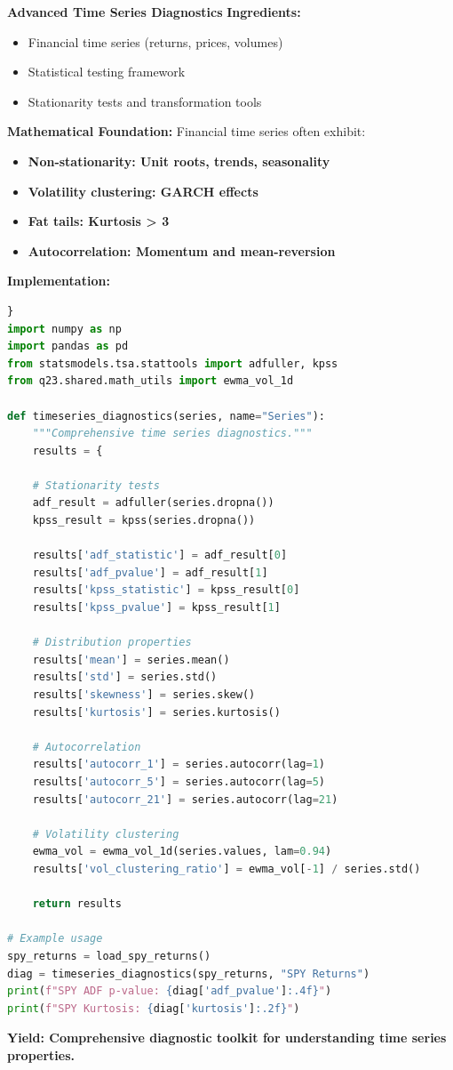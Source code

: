 \documentclass[11pt,letterpaper,openany]{book}
\begin{document}
\textbf{Advanced Time Series Diagnostics}
\textbf{Ingredients:}
\begin{itemize}
    \item Financial time series (returns, prices, volumes)
    \item Statistical testing framework
    \item Stationarity tests and transformation tools
\end{itemize}
\textbf{Mathematical Foundation:}
Financial time series often exhibit:
\begin{itemize}
    \item \textbf{Non-stationarity: Unit roots, trends, seasonality}
    \item \textbf{Volatility clustering: GARCH effects}
    \item \textbf{Fat tails: Kurtosis > 3}
    \item \textbf{Autocorrelation: Momentum and mean-reversion}
\end{itemize}
\textbf{Implementation:}
\begin{lstlisting}[language=Python,caption=Q23 Time Series Diagnostics]}
import numpy as np
import pandas as pd
from statsmodels.tsa.stattools import adfuller, kpss
from q23.shared.math_utils import ewma_vol_1d

def timeseries_diagnostics(series, name="Series"):
    """Comprehensive time series diagnostics."""
    results = {
    
    # Stationarity tests
    adf_result = adfuller(series.dropna())
    kpss_result = kpss(series.dropna())
    
    results['adf_statistic'] = adf_result[0]
    results['adf_pvalue'] = adf_result[1]
    results['kpss_statistic'] = kpss_result[0]
    results['kpss_pvalue'] = kpss_result[1]
    
    # Distribution properties
    results['mean'] = series.mean()
    results['std'] = series.std()
    results['skewness'] = series.skew()
    results['kurtosis'] = series.kurtosis()
    
    # Autocorrelation
    results['autocorr_1'] = series.autocorr(lag=1)
    results['autocorr_5'] = series.autocorr(lag=5)
    results['autocorr_21'] = series.autocorr(lag=21)
    
    # Volatility clustering
    ewma_vol = ewma_vol_1d(series.values, lam=0.94)
    results['vol_clustering_ratio'] = ewma_vol[-1] / series.std()
    
    return results

# Example usage
spy_returns = load_spy_returns()
diag = timeseries_diagnostics(spy_returns, "SPY Returns")
print(f"SPY ADF p-value: {diag['adf_pvalue']:.4f}")
print(f"SPY Kurtosis: {diag['kurtosis']:.2f}")
\end{lstlisting}
\textbf{Yield: Comprehensive diagnostic toolkit for understanding time series properties.}
\end{document}
